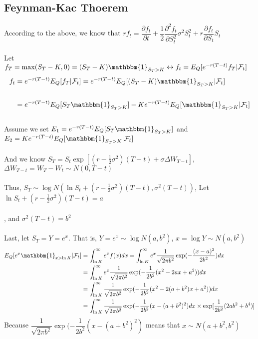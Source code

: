 \documentclass[12pt]{article}
\newcommand{\pfpt}{\dfrac{\partial f_t}{\partial t}}
\newcommand{\pfps}{\dfrac{\partial f_t}{\partial S_t}}
\newcommand{\pffpss}{\dfrac{\partial^2 f_t}{\partial S_t^2}}
\newcommand{\ind}{\mathbbm{1}}
\begin{document}
\subsection*{Feynman-Kac Thoerem}
According to the above, we know that $rf_t = \pfpt + \dfrac{1}{2}\pffpss \sigma^2 S_t^2 + r\pfps S_t$\\\\
Let $f_T = \max(S_T - K, 0) = (S_T-K)\ind_{S_T>K}\leftrightarrow f_t = E_Q[e^{-r(T-t)}f_T|\mathcal{F}_t]$\\
\begin{align*}
    f_t &= e^{-r(T-t)}E_Q[f_T|\mathcal{F}_t] = e^{-r(T-t)}E_Q[(S_T-K)\ind_{S_T>K}|\mathcal{F}_t]\\\\
    &= e^{-r(T-t)}E_Q[S_T\ind_{S_T>K}] - Ke^{-r(T-t)}E_Q[\ind_{S_T>K}|\mathcal{F}_t]
\end{align*}\\
Assume we set $E_1 = e^{-r(T-t)}E_Q[S_T\ind_{S_T>K}]$ and $E_2 = Ke^{-r(T-t)}E_Q[\ind_{S_T>K}|\mathcal{F}_t]$\\\\
And we know $S_T = S_t \exp[(r-\frac{1}{2}\sigma^2)(T-t)+\sigma\Delta W_{T-t}]$, $\Delta W_{T-t} = W_T - W_t \sim N(0, T-t)$\\\\
Thus, $S_T\sim \log N(\ln S_t + (r-\frac{1}{2}\sigma^2)(T-t), \sigma^2(T-t))$, Let $\ln S_t + (r-\frac{1}{2}\sigma^2)(T-t) = a$\\\\
, and $\sigma^2(T-t) = b^2$\\\\
Last, let $S_T = Y = e^x$. That is, $Y = e^x \sim \log N(a, b^2)$, $x = \log Y \sim N(a, b^2)$
\begin{align*}
    E_Q[e^x\ind_{x>\ln K}|\mathcal{F}_t] &= \int_{\ln K}^{\infty} e^xf(x)dx = \int_{\ln K}^{\infty} e^x \dfrac{1}{\sqrt{2\pi b^2}}\exp(-\dfrac{(x-a)^2}{2b^2})dx\\
    &= \int_{\ln K}^{\infty} e^x \dfrac{1}{\sqrt{2\pi b^2}}\exp(-\dfrac{1}{2b^2}(x^2 - 2ax + a^2))dx\\
    & = \int_{\ln K}^{\infty}\dfrac{1}{\sqrt{2\pi b^2}}\exp(-\dfrac{1}{2b^2}(x^2 -2(a+b^2)x + a^2))dx\\
    & = \int_{\ln K}^{\infty}\dfrac{1}{\sqrt{2\pi b^2}}\exp(-\dfrac{1}{2b^2}(x-(a+b^2)^2)dx\times \exp[\dfrac{1}{2b^2}(2ab^2 + b^4)]
\end{align*}
Because $\dfrac{1}{\sqrt{2\pi b^2}}\exp(-\dfrac{1}{2b^2}(x-(a+b^2)^2)$ means that $x\sim N(a+b^2, b^2)$\\
\end{document}
